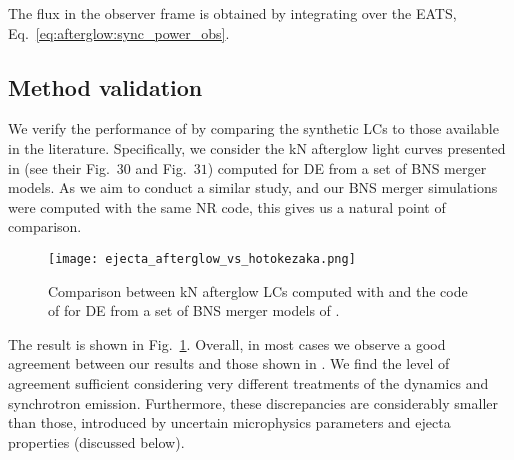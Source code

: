 The flux in the observer frame is obtained by integrating over the \ac{EATS}, 
Eq.~\eqref{eq:afterglow:sync_power_obs}.





\subsection{Method validation}

We verify the performance of \pyblast{} by comparing the synthetic \acp{LC} to 
those available in the literature. Specifically, we consider the \ac{kN} afterglow 
light curves presented in \citet{Radice:2018pdn} (see their Fig.~$30$ and Fig.~$31$) 
computed for \ac{DE} from a set of \ac{BNS} merger models. As we aim to conduct a 
similar study, and our \ac{BNS} merger simulations were computed with the same 
\ac{NR} code, this gives us a natural point of comparison. 
%
\begin{figure}[t]
    \centering 
    \texttt{[image: ejecta\_afterglow\_vs\_hotokezaka.png]}
    \caption{
        Comparison between \ac{kN} afterglow \acp{LC} computed with 
        \pyblast{} and the code of \citep{Hotokezaka:2015eja} for \ac{DE}
        from a set of \ac{BNS} merger models of \citep{Radice:2018pdn}. 
    } 
    \label{fig:afg_test}
\end{figure}
%
The result is shown in Fig.~\ref{fig:afg_test}. Overall, in most cases we observe 
a good agreement between our results and those shown in \citep{Radice:2018pdn}. 
%
We find the level of agreement sufficient considering very different treatments 
of the \blast{} dynamics and synchrotron emission. Furthermore, these discrepancies 
are considerably smaller than those, introduced by uncertain microphysics parameters 
and ejecta properties (discussed below).

